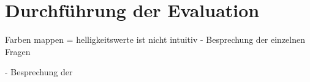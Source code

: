 \section{Durchführung der Evaluation}


Farben mappen = helligkeitswerte ist nicht intuitiv
- Besprechung der einzelnen Fragen

- Besprechung der 